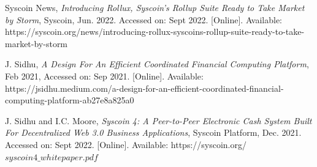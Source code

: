 \documentclass[journal,twocolumn,12pt]{ieeesyscoin}
\begin{document}
\begin{thebibliography}{00}
 Syscoin News, \textit{Introducing Rollux, Syscoin's Rollup Suite Ready to Take Market by Storm}, Syscoin, Jun. 2022. Accessed on: Sept 2022.  [Online]. Available: https://syscoin.org/news/introducing-rollux-syscoins-rollup-suite-ready-to-take-market-by-storm

 J. Sidhu, \textit{A Design For An Efficient Coordinated Financial Computing Platform}, Feb 2021, Accessed on: Sep 2021.  [Online]. Available:  https://jsidhu.medium.com/a-design-for-an-efficient-coordinated-financial-computing-platform-ab27e8a825a0

 J. Sidhu and I.C. Moore, \textit{Syscoin 4: A Peer-to-Peer Electronic Cash System Built For Decentralized
Web 3.0 Business Applications}, Syscoin Platform, Dec. 2021. Accessed on: Sept 2022. [Online]. Available: https://syscoin.org/$syscoin4\_whitepaper.pdf$



\end{thebibliography}


\EOD
\end{document}
